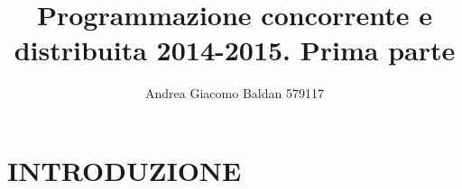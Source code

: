 \documentclass[10pt,a4paper]{article}
\title{Programmazione concorrente e distribuita 2014-2015. Prima parte}
\author{Andrea Giacomo Baldan 579117}
\begin{document}
\maketitle
\begingroup
\let\clearpage\relax
\section*{INTRODUZIONE}
\endgroup
\end{document}
